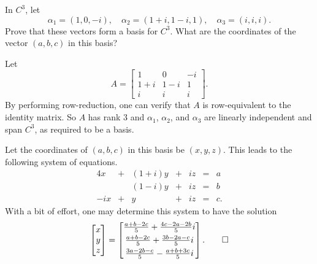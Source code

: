  In $C^3$, let
\begin{equation*}
  \alpha_1 = (1, 0, -i), \quad
  \alpha_2 = (1 + i, 1 - i, 1), \quad
  \alpha_3 = (i, i, i).
\end{equation*}
Prove that these vectors form a basis for $C^3$. What are the
coordinates of the vector $(a,b,c)$ in this basis?
\begin{solution}
  Let
  \begin{equation*}
    A =
    \begin{bmatrix}
      1 & 0 & -i \\
      1 + i & 1 - i & 1 \\
      i & i & i
    \end{bmatrix}.
  \end{equation*}
  By performing row-reduction, one can verify that $A$ is
  row-equivalent to the identity matrix. So $A$ has rank $3$ and
  $\alpha_1$, $\alpha_2$, and $\alpha_3$ are linearly independent and
  span $C^3$, as required to be a basis.

  Let the coordinates of $(a,b,c)$ in this basis be $(x,y,z)$. This
  leads to the following system of equations.
  \begin{alignat*}{4}
    x &{}+{}& (1 + i)y &{}+{}& iz &{}={}& a \\
    && (1 - i)y &{}+{}& iz &{}={}& b \\
    -ix &{}+{}& y &{}+{}& iz &{}={}& c.
  \end{alignat*}
  With a bit of effort, one may determine this system to have the
  solution
  \begin{equation*}
    \begin{bmatrix}
      x \\ y \\ z
    \end{bmatrix}
    =
    \begin{bmatrix}
      \frac{a + b - 2c}5 + \frac{4c - 2a - 2b}5i \\[3pt]
      \frac{a + b - 2c}5 + \frac{3b - 2a - c}5i \\[3pt]
      \frac{3a - 2b - c}5 - \frac{a + b + 3c}5i
    \end{bmatrix}. \qedhere
  \end{equation*}
\end{solution}

